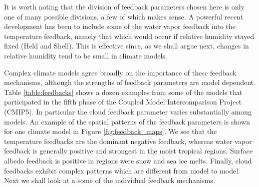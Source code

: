 \documentclass[12pt]{book}
\begin{document}
It is worth noting that the division of feedback parameters chosen here is only one of many possible divisions, a few of which makes sense. A powerful recent development has been to include some of the water vapor feedback into the temperature feedback, namely that which would occur if relative humidity stayed fixed (Held and Shell\cite{Held2012}). This is effective since, as we shall argue next, changes in relative humidity tend to be small in climate models. 

Complex climate models agree broadly on the importance of these feedback mechanisms, although the strengths of feedback parameters are model dependent. Table \ref{table:feedbacks} shows a dozen examples from some of the models that participated in the fifth phase of the Coupled Model Intercomparison Project (CMIP5). In particular the cloud feedback parameter varies substantially among models. An example of the spatial patterns of the feedback parameters is shown for one climate model in Figure \ref{fig:feedback_maps}. We see that the temperature feedbacks are the dominant negative feedback, whereas water vapor feedback is generally positive and strongest in the moist tropical regions. Surface albedo feedback is positive in regions were snow and sea ice melts. Finally, cloud feedbacks exhibit complex patterns which are different from model to model. Next we shall look at a some of the individual feedback mechanisms.
\end{document}
